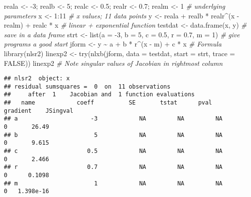 \documentclass[
]{article}
\newenvironment{Shaded}{\begin{snugshade}}{\end{snugshade}}
\newcommand{\AttributeTok}[1]{\textcolor[rgb]{0.77,0.63,0.00}{#1}}
\newcommand{\CommentTok}[1]{\textcolor[rgb]{0.56,0.35,0.01}{\textit{#1}}}
\newcommand{\ConstantTok}[1]{\textcolor[rgb]{0.00,0.00,0.00}{#1}}
\newcommand{\DecValTok}[1]{\textcolor[rgb]{0.00,0.00,0.81}{#1}}
\newcommand{\FloatTok}[1]{\textcolor[rgb]{0.00,0.00,0.81}{#1}}
\newcommand{\FunctionTok}[1]{\textcolor[rgb]{0.00,0.00,0.00}{#1}}
\newcommand{\NormalTok}[1]{#1}
\newcommand{\OtherTok}[1]{\textcolor[rgb]{0.56,0.35,0.01}{#1}}
\newcommand{\SpecialCharTok}[1]{\textcolor[rgb]{0.00,0.00,0.00}{#1}}
\begin{document}
\begin{Shaded}
\begin{Highlighting}[]
\NormalTok{reala }\OtherTok{\textless{}{-}} \SpecialCharTok{{-}}\DecValTok{3}\NormalTok{; realb }\OtherTok{\textless{}{-}} \DecValTok{5}\NormalTok{; realc }\OtherTok{\textless{}{-}} \FloatTok{0.5}\NormalTok{; realr }\OtherTok{\textless{}{-}} \FloatTok{0.7}\NormalTok{; realm }\OtherTok{\textless{}{-}} \DecValTok{1} \CommentTok{\# underlying parameters}
\NormalTok{x }\OtherTok{\textless{}{-}} \DecValTok{1}\SpecialCharTok{:}\DecValTok{11} \CommentTok{\# x values; 11 data points}
\NormalTok{y }\OtherTok{\textless{}{-}}\NormalTok{ reala }\SpecialCharTok{+}\NormalTok{ realb }\SpecialCharTok{*}\NormalTok{ realr}\SpecialCharTok{\^{}}\NormalTok{(x }\SpecialCharTok{{-}}\NormalTok{ realm) }\SpecialCharTok{+}\NormalTok{ realc }\SpecialCharTok{*}\NormalTok{ x }\CommentTok{\# linear + exponential function}
\NormalTok{testdat }\OtherTok{\textless{}{-}} \FunctionTok{data.frame}\NormalTok{(x, y) }\CommentTok{\# save in a data frame}
\NormalTok{strt }\OtherTok{\textless{}{-}} \FunctionTok{list}\NormalTok{(}\AttributeTok{a =} \SpecialCharTok{{-}}\DecValTok{3}\NormalTok{, }\AttributeTok{b =} \DecValTok{5}\NormalTok{, }\AttributeTok{c =} \FloatTok{0.5}\NormalTok{, }\AttributeTok{r =} \FloatTok{0.7}\NormalTok{, }\AttributeTok{m =} \DecValTok{1}\NormalTok{) }\CommentTok{\# give programs a good start}
\NormalTok{jform }\OtherTok{\textless{}{-}}\NormalTok{ y }\SpecialCharTok{\textasciitilde{}}\NormalTok{ a }\SpecialCharTok{+}\NormalTok{ b }\SpecialCharTok{*}\NormalTok{ r}\SpecialCharTok{\^{}}\NormalTok{(x }\SpecialCharTok{{-}}\NormalTok{ m) }\SpecialCharTok{+}\NormalTok{ c }\SpecialCharTok{*}\NormalTok{ x }\CommentTok{\# Formula}
\FunctionTok{library}\NormalTok{(nlsr2)}
\NormalTok{linexp2 }\OtherTok{\textless{}{-}} \FunctionTok{try}\NormalTok{(}\FunctionTok{nlxb}\NormalTok{(jform, }\AttributeTok{data =}\NormalTok{ testdat, }\AttributeTok{start =}\NormalTok{ strt, }\AttributeTok{trace =} \ConstantTok{FALSE}\NormalTok{))}
\NormalTok{linexp2 }\CommentTok{\# Note singular values of Jacobian in rightmost column}
\end{Highlighting}
\end{Shaded}

\begin{verbatim}
## nlsr2  object: x 
## residual sumsquares =  0  on  11 observations
##     after  1    Jacobian and  1 function evaluations
##   name            coeff          SE       tstat      pval      gradient    JSingval   
## a                     -3            NA         NA         NA           0       26.49  
## b                      5            NA         NA         NA           0       9.615  
## c                    0.5            NA         NA         NA           0       2.466  
## r                    0.7            NA         NA         NA           0      0.1098  
## m                      1            NA         NA         NA           0   1.398e-16
\end{verbatim}
\end{document}
